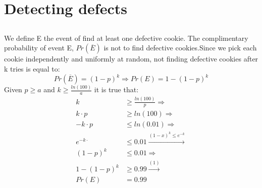 \documentclass[11pt]{537homework}
\author{Emmanouil Kritharakis}
\begin{document}
\section{Detecting defects}


\subsection{}
We define E the event of find at least one defective cookie. The complimentary probability of event E, $Pr(\overline{E})$ is not to find defective cookies.Since we pick each cookie independently and uniformly at random, not finding defective cookies after k tries is equal to:
\begin{equation}
    Pr(\overline{E}) = (1-p)^k \Longrightarrow 
    Pr(E) = 1 - (1-p)^k
\end{equation}
Given $p \geq a$ and $ k \geq \frac{ln(100)}{a}$ it is true that:
\allowdisplaybreaks
\begin{align*}
  k & \geq \frac{ln(100)}{p} \Longrightarrow \\
  k \cdot p  & \geq ln(100) \Longrightarrow \\
  -k \cdot p &\leq ln(0.01) \Longrightarrow \\
  e^{-k\cdotp} & \leq 0.01 \xrightarrow{(1-x)^k \leq e^{-k}}\\
  (1-p)^k & \leq 0.01 \Longrightarrow \\
  1 - (1-p)^k & \geq 0.99 \xrightarrow{(1)} \\
  Pr(E) &= 0.99
\end{align*}
\endgroup
\end{document}
